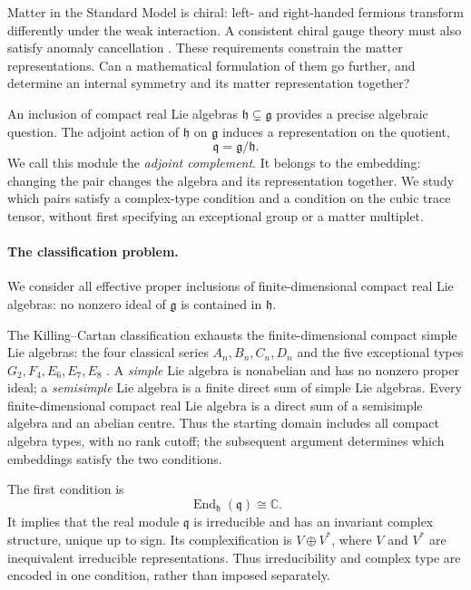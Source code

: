 \documentclass[11pt]{article}
\theoremstyle{remark}
\begin{document}
Matter in the Standard Model is chiral: left- and right-handed fermions
transform differently under the weak interaction. A consistent chiral gauge
theory must also satisfy anomaly cancellation \cite{ParticleDataGroup}.
These requirements constrain the matter representations. Can a mathematical
formulation of them go further, and determine an internal symmetry and its
matter representation together?

An inclusion of compact real Lie algebras
\(\mathfrak h\subsetneq\mathfrak g\) provides a precise algebraic
question. The adjoint action of \(\mathfrak h\) on \(\mathfrak g\)
induces a representation on the quotient,
\[
 \mathfrak q=\mathfrak g/\mathfrak h.
\]
We call this module the \emph{adjoint complement}. It belongs to the
embedding: changing the pair changes the algebra and its representation together. We study
which pairs satisfy a complex-type condition and a condition on the cubic
trace tensor, without first specifying an exceptional group or a matter
multiplet.

\paragraph{The classification problem.}
We consider all effective proper inclusions of finite-dimensional compact
real Lie algebras: no nonzero ideal of \(\mathfrak g\) is contained in
\(\mathfrak h\).

The Killing--Cartan classification exhausts the finite-dimensional compact
simple Lie algebras: the four classical series \(A_n,B_n,C_n,D_n\) and the
five exceptional types \(G_2,F_4,E_6,E_7,E_8\) \cite[Ch.~VI]{Bourbaki}.
A \emph{simple} Lie algebra is nonabelian and has no nonzero proper ideal;
a \emph{semisimple} Lie algebra is a finite direct sum of simple Lie algebras.
Every finite-dimensional compact real Lie algebra is a direct sum of a
semisimple algebra and an abelian centre. Thus the starting domain includes
all compact algebra types, with no rank cutoff; the subsequent argument
determines which embeddings satisfy the two conditions.

The first condition is
\[
 \operatorname{End}_{\mathfrak h}(\mathfrak q)\cong\mathbb C.
\]
It implies that the real module \(\mathfrak q\) is irreducible and has an
invariant complex structure, unique up to sign. Its complexification is
\(V\oplus V^*\), where \(V\) and \(V^*\) are inequivalent irreducible
representations. Thus irreducibility and complex type are
encoded in one condition, rather than imposed separately.
\end{document}
